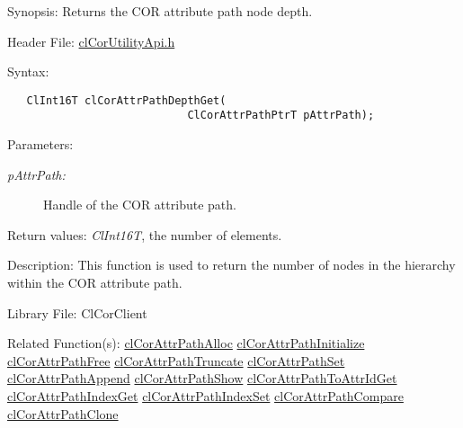 \begin{Desc}
\item[Synopsis:]Returns the COR attribute path node depth.\end{Desc}
\begin{Desc}
\item[Header File:]\hyperlink{cl_cor_utility_api_8h}{cl\-Cor\-Utility\-Api.h}\end{Desc}
\begin{Desc}
\item[Syntax:]

\footnotesize\begin{verbatim}   ClInt16T clCorAttrPathDepthGet(
                            ClCorAttrPathPtrT pAttrPath);
\end{verbatim}
\normalsize
\end{Desc}
\begin{Desc}
\item[Parameters:]
\begin{description}
\item[{\em p\-Attr\-Path:}]Handle of the COR attribute path.\end{description}
\end{Desc}
\begin{Desc}
\item[Return values:]{\em Cl\-Int16T\/}, the number of elements.\end{Desc}
\begin{Desc}
\item[Description:]This function is used to return the number of nodes in the hierarchy within the COR attribute path.\end{Desc}
\begin{Desc}
\item[Library File:]Cl\-Cor\-Client\end{Desc}
\begin{Desc}
\item[Related Function(s):]\hyperlink{group__group13}{cl\-Cor\-Attr\-Path\-Alloc} \hyperlink{group__group13}{cl\-Cor\-Attr\-Path\-Initialize} \hyperlink{group__group13}{cl\-Cor\-Attr\-Path\-Free} \hyperlink{group__group13}{cl\-Cor\-Attr\-Path\-Truncate} \hyperlink{group__group13}{cl\-Cor\-Attr\-Path\-Set} \hyperlink{group__group13}{cl\-Cor\-Attr\-Path\-Append} \hyperlink{group__group13}{cl\-Cor\-Attr\-Path\-Show} \hyperlink{group__group13}{cl\-Cor\-Attr\-Path\-To\-Attr\-Id\-Get} \hyperlink{group__group13}{cl\-Cor\-Attr\-Path\-Index\-Get} \hyperlink{group__group13}{cl\-Cor\-Attr\-Path\-Index\-Set} \hyperlink{group__group13}{cl\-Cor\-Attr\-Path\-Compare} \hyperlink{group__group13}{cl\-Cor\-Attr\-Path\-Clone} \end{Desc}
